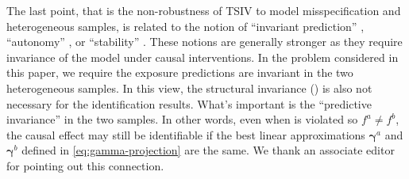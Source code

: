 \documentclass[preprint]{imsart}
\begin{document}
The last point, that is the non-robustness of TSIV to model
misspecification and heterogeneous samples, is related to the notion
of ``invariant prediction''
\citep{peters2016causal}, ``autonomy''
\citep{haavelmo1944probability}, or ``stability''
\citep{pearl2009causality}. These notions are generally stronger as
they require invariance of the model under causal interventions. In
the problem considered in this paper, we require the exposure
predictions are invariant in the two heterogeneous samples. In this
view, the structural invariance () is also not
necessary for the identification results. What's important is the
``predictive invariance'' in the two samples. In other words, even when
 is violated so $f^a \ne f^b$, the causal
effect may still be identifiable if the best linear
approximations $\bm \gamma^a$ and $\bm \gamma^b$ defined in
\eqref{eq:gamma-projection} are the same.  We thank an associate editor
for pointing out this connection.





\end{document}
